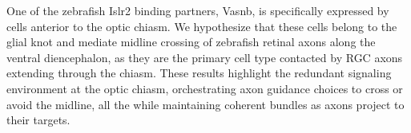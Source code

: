 One of the zebrafish Islr2 binding partners, Vasnb, is specifically expressed by cells anterior to the optic chiasm.
We hypothesize that these cells belong to the glial knot and mediate midline crossing of zebrafish retinal axons along the ventral diencephalon, as they are the primary cell type contacted by RGC axons extending through the chiasm.
These results highlight the redundant signaling environment at the optic chiasm, orchestrating axon guidance choices to cross or avoid the midline, all the while maintaining coherent bundles as axons project to their targets.